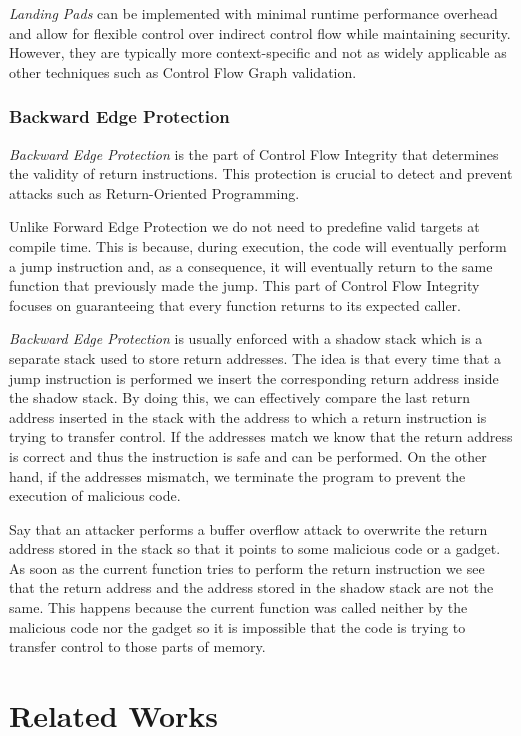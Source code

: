 \textit{Landing Pads} can be implemented with minimal runtime performance
overhead and allow for flexible control over indirect control flow while
maintaining security. However, they are typically more context-specific and not
as widely applicable as other techniques such as Control Flow Graph validation.

\subsubsection{Backward Edge Protection}
\label{subsubsec:background_backward}

\textit{Backward Edge Protection} is the part of Control Flow Integrity that
determines the validity of return instructions. This protection is crucial to detect
and prevent attacks such as Return-Oriented Programming.

Unlike Forward Edge Protection we do not need to predefine valid targets at compile
time. This is because, during execution, the code will eventually perform a jump
instruction and, as a consequence, it will eventually return to the same
function that previously made the jump. This part of Control Flow Integrity focuses
on guaranteeing that every function returns to its expected caller.

\textit{Backward Edge Protection} is usually enforced with a shadow stack which
is a separate stack used to store return addresses. The idea is that every time that
a jump instruction is performed we insert the corresponding return address inside
the shadow stack. By doing this, we can effectively compare the last return address
inserted in the stack with the address to which a return instruction is trying to
transfer control. If the addresses match we know that the return address is
correct and thus the instruction is safe and can be performed. On the other hand,
if the addresses mismatch, we terminate the program to prevent the execution of malicious
code.

Say that an attacker performs a buffer overflow attack to overwrite the return address
stored in the stack so that it points to some malicious code or a gadget. As
soon as the current function tries to perform the return instruction we see that
the return address and the address stored in the shadow stack are not the same. This
happens because the current function was called neither by the malicious code nor
the gadget so it is impossible that the code is trying to transfer control to those
parts of memory.

\section{Related Works}
\label{sec:background_related}

